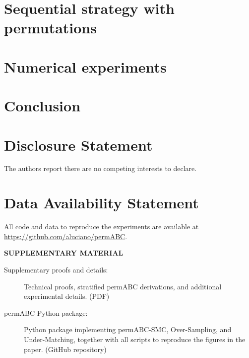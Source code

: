 \documentclass[12pt]{article}
\theoremstyle{remark}
\theoremstyle{plain}
\begin{document}
\section{Sequential strategy with permutations}
\label{sec:sequential}


\section{Numerical experiments}
\label{sec:numeric}


\section{Conclusion}




\section*{Disclosure Statement}
The authors report there are no competing interests to declare.

\section*{Data Availability Statement}
All code and data to reproduce the experiments are available at
\url{https://github.com/aluciano/permABC}.

\bigskip
\begin{center}
{\large\bf SUPPLEMENTARY MATERIAL}
\end{center}

\begin{description}
\item[Supplementary proofs and details:]
  Technical proofs, stratified permABC derivations, and additional
  experimental details. (PDF)
\item[permABC Python package:]
  Python package implementing permABC-SMC, Over-Sampling, and
  Under-Matching, together with all scripts to reproduce the figures
  in the paper. (GitHub repository)
\end{description}



\end{document}
